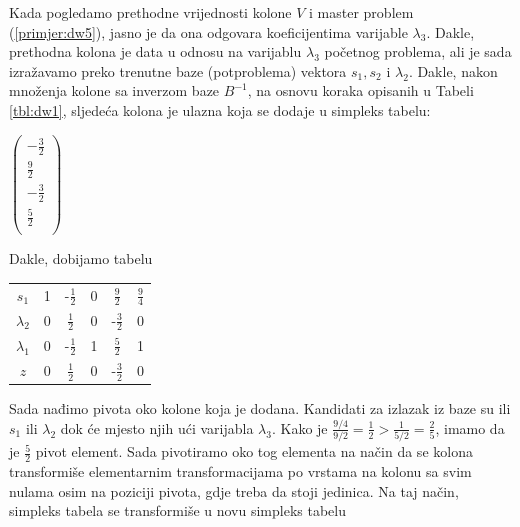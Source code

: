 \documentclass[a4paper, utf8, 11pt, colorlinks]{book}
\theoremstyle{definition}
\begin{document}
Kada pogledamo prethodne vrijednosti kolone $V$ i master problem (\ref{primjer:dw5}), jasno je da ona odgovara koeficijentima varijable $\lambda_3$. Dakle, prethodna kolona je data u odnosu na varijablu $\lambda_3$ početnog problema, ali je sada izražavamo preko trenutne baze (potproblema) vektora $s_1, s_2$ i $\lambda_2$. Dakle, nakon množenja kolone sa inverzom baze $B^{-1}$, na osnovu koraka opisanih u Tabeli \ref{tbl:dw1}, sljedeća kolona je ulazna koja se dodaje u simpleks tabelu:

\begin{center}
 
  $\begin{pmatrix}
	 -\frac{3}{2}            \\
	 \frac{9}{2}     \\
 	-\frac{3}{2}       \\
	 \frac{5}{2}    \\
   \end{pmatrix}$
\end{center}
Dakle, dobijamo tabelu 

\begin{center}
 
		\begin{tabular}{c|cccc|c}
		   $s_1$	    &   1      &   -$\frac{1}{2}$         &   0         &   $\frac{9}{2}$          &  $\frac{9}{4}$ \\
		   $\lambda_2$  &   0      &    $\frac{1}{2}$         &   0         &  -$ \frac{3}{2}$         &  0             \\
		   $\lambda_1$  &   0      &    -$\frac{1}{2}$        &   1         &  $\frac{5}{2} $          &  1             \\ \hline
		   $z$          &   0      &    $\frac{1}{2}$         &   0         &   -$\frac{3}{2}$       & 0  
	\end{tabular}
 
\end{center} 
Sada nađimo pivota oko kolone koja je dodana. Kandidati za izlazak iz baze su ili $s_1$ ili $\lambda_2$ dok će mjesto njih ući varijabla $\lambda_3$. Kako je $\frac{9/4}{9/2}=\frac{1}{2} > \frac{1}{5/2}=\frac{2}{5}$, imamo da je $\frac{5}{2}$ pivot element. Sada pivotiramo oko tog elementa na način da se kolona transformiše elementarnim transformacijama po vrstama na kolonu sa svim nulama osim na poziciji pivota, gdje treba da stoji jedinica. Na taj način, simpleks tabela se transformiše u novu simpleks tabelu 
\end{document}
